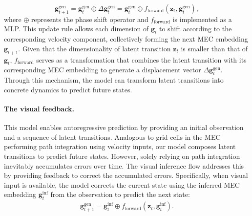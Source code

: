 \begin{equation}\label{eq:forward}
    \boldsymbol{g}_{t+1}^{\text{gen}} = \boldsymbol{g}_{t}^{\text{gen}} \oplus \Delta \boldsymbol{g}_{t}^{\text{gen}} = \boldsymbol{g}_{t}^{\text{gen}} \oplus f_{\text{forward}}(\boldsymbol{z}_t, \boldsymbol{g}_t^{\text{gen}}),
\end{equation}
where $\oplus$ represents the phase shift operator and $f_{\text{forward}}$ is implemented as a MLP. This update rule allows each dimension of $\boldsymbol{g}_t$ to shift according to the corresponding velocity component, collectively forming the next MEC embedding $\boldsymbol{g}_{t+1}$.
Given that the dimensionality of latent transition $\boldsymbol{z}_t$ is smaller than that of $\boldsymbol{g}_t$, $f_{\text{forward}}$ serves as a transformation that combines the latent transition with its corresponding MEC embedding to generate a displacement vector $\Delta \boldsymbol{g}_{t}^{\text{gen}}$. Through this mechanism, the model can transform latent transitions into concrete dynamics to predict future states.

\paragraph{The visual feedback.}
This model enables autoregressive prediction by providing an initial observation and a sequence of latent transitions. Analogous to grid cells in the MEC performing path integration using velocity inputs, our model composes latent transitions to predict future states. However, solely relying on path integration inevitably accumulates errors over time. The visual inference flow addresses this by providing feedback to correct the accumulated errors. 
Specifically, when visual input is available, the model corrects the current state using the inferred MEC embedding $\boldsymbol{g}_t^{\text{inf}}$ from the observation to predict the next state: 
\begin{equation}
    \begin{aligned}
    \boldsymbol{g}^{\text{gen}}_{t+1} = \boldsymbol{g}^{\text{inf}}_{t} \oplus f_{\text{forward}}(\boldsymbol{z}_t, \boldsymbol{g}^{\text{inf}}_{t}).
    \end{aligned}
\end{equation}

